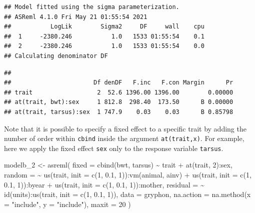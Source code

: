 \documentclass[
  12pt,
]{book}
\newenvironment{Shaded}{\begin{snugshade}}{\end{snugshade}}
\newcommand{\AttributeTok}[1]{\textcolor[rgb]{0.77,0.63,0.00}{#1}}
\newcommand{\DecValTok}[1]{\textcolor[rgb]{0.00,0.00,0.81}{#1}}
\newcommand{\FloatTok}[1]{\textcolor[rgb]{0.00,0.00,0.81}{#1}}
\newcommand{\FunctionTok}[1]{\textcolor[rgb]{0.00,0.00,0.00}{#1}}
\newcommand{\NormalTok}[1]{#1}
\newcommand{\OtherTok}[1]{\textcolor[rgb]{0.56,0.35,0.01}{#1}}
\newcommand{\SpecialCharTok}[1]{\textcolor[rgb]{0.00,0.00,0.00}{#1}}
\newcommand{\StringTok}[1]{\textcolor[rgb]{0.31,0.60,0.02}{#1}}
\begin{document}
\begin{verbatim}
## Model fitted using the sigma parameterization.
## ASReml 4.1.0 Fri May 21 01:55:54 2021
##           LogLik        Sigma2     DF     wall    cpu
##  1     -2380.246           1.0   1533 01:55:54    0.1
##  2     -2380.246           1.0   1533 01:55:54    0.0
## Calculating denominator DF
\end{verbatim}

\begin{verbatim}
## 
##                       Df denDF   F.inc   F.con Margin      Pr
## trait                  2  52.6 1396.00 1396.00        0.00000
## at(trait, bwt):sex     1 812.8  298.40  173.50      B 0.00000
## at(trait, tarsus):sex  1 747.9    0.03    0.03      B 0.85798
\end{verbatim}

Note that it is possible to specify a fixed effect to a specific trait by adding the number of order within \texttt{cbind} inside the argument \texttt{at(trait,x)}. For example, here we apply the fixed effect \texttt{sex} only to the response variable \texttt{tarsus}.

\begin{Shaded}
\begin{Highlighting}[]
\NormalTok{modelb\_2 }\OtherTok{\textless{}{-}} \FunctionTok{asreml}\NormalTok{(}
  \AttributeTok{fixed =} \FunctionTok{cbind}\NormalTok{(bwt, tarsus) }\SpecialCharTok{\textasciitilde{}}\NormalTok{ trait }\SpecialCharTok{+} \FunctionTok{at}\NormalTok{(trait, }\DecValTok{2}\NormalTok{)}\SpecialCharTok{:}\NormalTok{sex,}
  \AttributeTok{random =} \SpecialCharTok{\textasciitilde{}} \FunctionTok{us}\NormalTok{(trait, }\AttributeTok{init =} \FunctionTok{c}\NormalTok{(}\DecValTok{1}\NormalTok{, }\FloatTok{0.1}\NormalTok{, }\DecValTok{1}\NormalTok{))}\SpecialCharTok{:}\FunctionTok{vm}\NormalTok{(animal, ainv) }\SpecialCharTok{+}
    \FunctionTok{us}\NormalTok{(trait, }\AttributeTok{init =} \FunctionTok{c}\NormalTok{(}\DecValTok{1}\NormalTok{, }\FloatTok{0.1}\NormalTok{, }\DecValTok{1}\NormalTok{))}\SpecialCharTok{:}\NormalTok{byear }\SpecialCharTok{+}
    \FunctionTok{us}\NormalTok{(trait, }\AttributeTok{init =} \FunctionTok{c}\NormalTok{(}\DecValTok{1}\NormalTok{, }\FloatTok{0.1}\NormalTok{, }\DecValTok{1}\NormalTok{))}\SpecialCharTok{:}\NormalTok{mother,}
  \AttributeTok{residual =} \SpecialCharTok{\textasciitilde{}} \FunctionTok{id}\NormalTok{(units)}\SpecialCharTok{:}\FunctionTok{us}\NormalTok{(trait, }\AttributeTok{init =} \FunctionTok{c}\NormalTok{(}\DecValTok{1}\NormalTok{, }\FloatTok{0.1}\NormalTok{, }\DecValTok{1}\NormalTok{)),}
  \AttributeTok{data =}\NormalTok{ gryphon,}
  \AttributeTok{na.action =} \FunctionTok{na.method}\NormalTok{(}\AttributeTok{x =} \StringTok{"include"}\NormalTok{, }\AttributeTok{y =} \StringTok{"include"}\NormalTok{),}
  \AttributeTok{maxit =} \DecValTok{20}
\NormalTok{)}
\end{Highlighting}
\end{Shaded}
\end{document}
